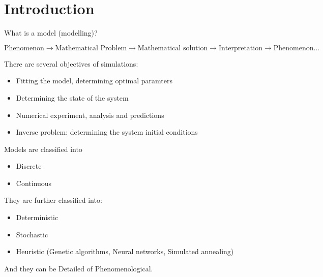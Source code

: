 \section{Introduction}

What is a model (modelling)? 

\begin{equation*}
    \text{Phenomenon}  \rightarrow  \text{Mathematical Problem}  \rightarrow  \text{Mathematical solution}  \rightarrow  \text{Interpretation}  \rightarrow  \text{Phenomenon} \dots
\end{equation*}

\noindent
There are several objectives of simulations:
\begin{itemize}
    \item Fitting the model, determining optimal paramters
    \item Determining the state of the system
    \item Numerical experiment, analysis and predictions
    \item Inverse problem: determining the system initial conditions
\end{itemize}

\noindent
Models are classified into
\begin{itemize}
    \item Discrete
    \item Continuous
\end{itemize}

\noindent
They are further classified into:
\begin{itemize}
    \item Deterministic
    \item Stochastic
    \item Heuristic (Genetic algorithms, Neural networks, Simulated annealing)
\end{itemize}

\noindent
And they can be Detailed of Phenomenological.